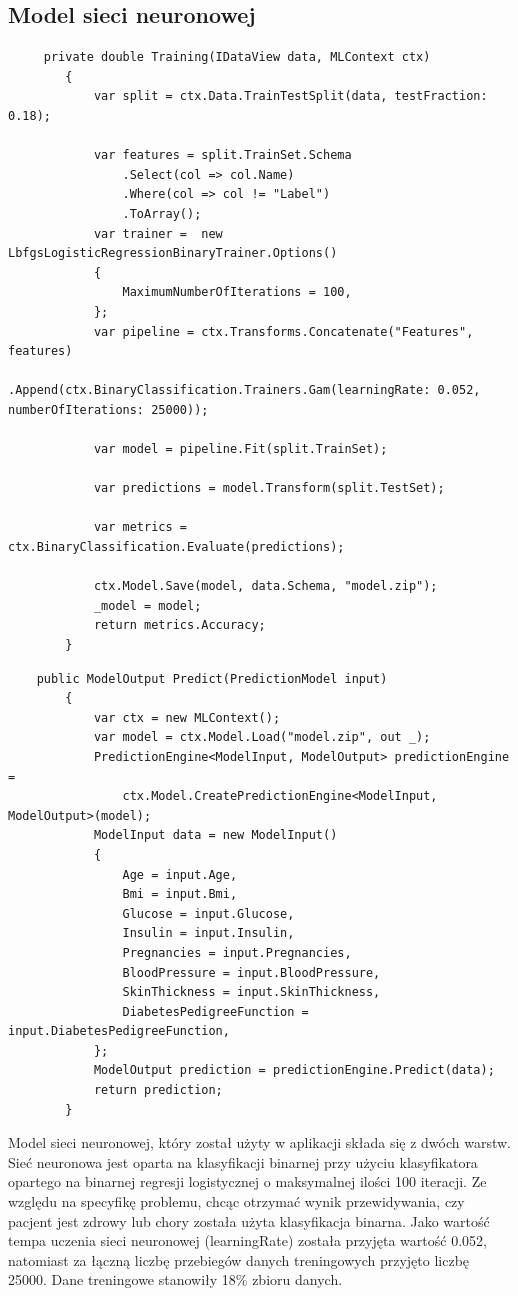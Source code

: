\documentclass[12pt,a4paper]{article}
\begin{document}
 \subsection{Model sieci neuronowej}
	\begin{lstlisting}
	 private double Training(IDataView data, MLContext ctx)
        {
            var split = ctx.Data.TrainTestSplit(data, testFraction: 0.18);

            var features = split.TrainSet.Schema
                .Select(col => col.Name)
                .Where(col => col != "Label")
                .ToArray();
            var trainer =  new LbfgsLogisticRegressionBinaryTrainer.Options()
            {
                MaximumNumberOfIterations = 100,
            };
            var pipeline = ctx.Transforms.Concatenate("Features", features)
                .Append(ctx.BinaryClassification.Trainers.Gam(learningRate: 0.052, numberOfIterations: 25000));

            var model = pipeline.Fit(split.TrainSet);

            var predictions = model.Transform(split.TestSet);

            var metrics = ctx.BinaryClassification.Evaluate(predictions);

            ctx.Model.Save(model, data.Schema, "model.zip");
            _model = model;
            return metrics.Accuracy;
        }
	\end{lstlisting}
	\newpage
	\begin{lstlisting}
	public ModelOutput Predict(PredictionModel input)
        {
            var ctx = new MLContext();
            var model = ctx.Model.Load("model.zip", out _);
            PredictionEngine<ModelInput, ModelOutput> predictionEngine =
                ctx.Model.CreatePredictionEngine<ModelInput, ModelOutput>(model);
            ModelInput data = new ModelInput()
            {
                Age = input.Age,
                Bmi = input.Bmi,
                Glucose = input.Glucose,
                Insulin = input.Insulin,
                Pregnancies = input.Pregnancies,
                BloodPressure = input.BloodPressure,
                SkinThickness = input.SkinThickness,
                DiabetesPedigreeFunction = input.DiabetesPedigreeFunction,
            };
            ModelOutput prediction = predictionEngine.Predict(data);
            return prediction;
        }
	\end{lstlisting}
	 
	Model sieci neuronowej, który został użyty w aplikacji składa się z dwóch warstw. Sieć neuronowa jest oparta na klasyfikacji binarnej przy użyciu klasyfikatora opartego na binarnej regresji logistycznej o maksymalnej ilości 100 iteracji. Ze względu na specyfikę problemu, chcąc otrzymać wynik przewidywania, czy pacjent jest zdrowy lub chory została użyta klasyfikacja binarna. Jako wartość tempa uczenia sieci neuronowej (learningRate) została przyjęta wartość 0.052, natomiast za łączną liczbę przebiegów danych treningowych przyjęto liczbę 25000. Dane treningowe stanowiły 18\% zbioru danych.
    
\end{document}
